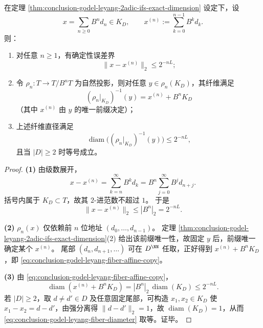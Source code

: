 \begin{proposition}[截断误差最优界与分辨率纤维几何]\label{prop:conclusion-godel-leyang-truncation-fiber}
在定理 \ref{thm:conclusion-godel-leyang-2adic-ifs-exact-dimension} 设定下，设
\[
x=\sum_{n\ge 0}B^n d_n\in K_D,\qquad
x^{(n)}:=\sum_{k=0}^{n-1}B^k d_k.
\]
则：
\begin{enumerate}
  \item 对任意 \(n\ge 1\)，有确定性误差界
  \begin{equation}\label{eq:conclusion-godel-leyang-trunc-error}
  \|x-x^{(n)}\|_2\le 2^{-nL};
  \end{equation}
  \item 令 \(\rho_n:T\to T/B^nT\) 为自然投影，则对任意 \(y\in \rho_n(K_D)\)，其纤维满足
  \begin{equation}\label{eq:conclusion-godel-leyang-fiber-affine-copy}
  (\rho_n|_{K_D})^{-1}(y)=x^{(n)}+B^nK_D
  \end{equation}
  （其中 \(x^{(n)}\) 由 \(y\) 的唯一前缀决定）；
  \item 上述纤维直径满足
  \begin{equation}\label{eq:conclusion-godel-leyang-fiber-diameter}
  \operatorname{diam}\!\bigl((\rho_n|_{K_D})^{-1}(y)\bigr)\le 2^{-nL},
  \end{equation}
  且当 \(|D|\ge 2\) 时等号成立。
\end{enumerate}
\end{proposition}
\begin{proof}
\textbf{(1)} 由级数展开，
\[
x-x^{(n)}=\sum_{k=n}^{\infty}B^k d_k
=B^n\sum_{j=0}^{\infty}B^j d_{n+j}.
\]
括号内属于 \(K_D\subset T\)，故其 \(2\)-进范数不超过 \(1\)。
于是
\[
\|x-x^{(n)}\|_2\le |B^n|_2=2^{-nL}.
\]

\textbf{(2)} \(\rho_n(x)\) 仅依赖前 \(n\) 位地址 \((d_0,\dots,d_{n-1})\)。
定理 \ref{thm:conclusion-godel-leyang-2adic-ifs-exact-dimension}(2) 给出该前缀唯一性，故固定 \(y\) 后，前缀唯一确定某个 \(x^{(n)}\)。
尾部 \((d_n,d_{n+1},\dots)\) 可在 \(D^{\NN}\) 任取，正好得到 \(x^{(n)}+B^nK_D\)，即 \eqref{eq:conclusion-godel-leyang-fiber-affine-copy}。

\textbf{(3)} 由 \eqref{eq:conclusion-godel-leyang-fiber-affine-copy}，
\[
\operatorname{diam}(x^{(n)}+B^nK_D)=|B^n|_2\,\operatorname{diam}(K_D)\le 2^{-nL}.
\]
若 \(|D|\ge 2\)，取 \(d\neq d'\in D\) 及任意固定尾部，可构造 \(x_1,x_2\in K_D\) 使 \(x_1-x_2=d-d'\)，由强分离得 \(\|d-d'\|_2=1\)，故 \(\operatorname{diam}(K_D)=1\)，从而 \eqref{eq:conclusion-godel-leyang-fiber-diameter} 取等。证毕。
\end{proof}

